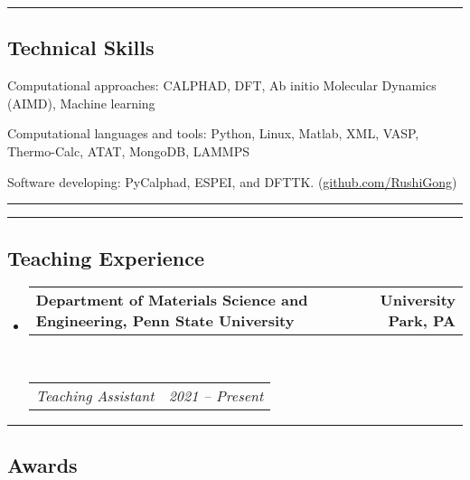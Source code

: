 \documentclass[10pt,letterpaper]{article}
\makeatletter
\newenvironment{indentsection}[1]%
{\begin{list}{}%
  {\setlength{\leftmargin}{#1}}%
  \item[]%
}
{\end{list}}
\newcommand{\headerrow}[2]
{\begin{tabular*}{\linewidth}{l@{\extracolsep{\fill}}r}
  #1 &
  #2 \\
\end{tabular*}}
\makeatother
\begin{document}
\hrule
\vspace{-0.6em}
\subsection*{Technical Skills}

\begin{indentsection}{\parindent}
\begin{description*}
  \item[Computational approaches:]
  CALPHAD, DFT, Ab initio Molecular Dynamics (AIMD), Machine learning
  \item[Computational languages and tools:]
  Python, Linux, Matlab, XML, VASP, Thermo-Calc, ATAT, MongoDB, LAMMPS
  \item [Software developing:]
  PyCalphad, ESPEI, and DFTTK. (\href{https://github.com/RushiGong}{github.com/RushiGong})
\end{description*}
\end{indentsection}

\hrule
\pagebreak

\hrule
\vspace{-0.6em}
\subsection*{Teaching Experience}

\renewcommand\labelitemiii{$\circ$}
\begin{itemize}
    \parskip=0.1em

    \item
    \headerrow
    {\textbf{Department of Materials Science and Engineering, Penn State University}}
    {\textbf{University Park, PA}}
    \\
    \headerrow
    {\emph{Teaching Assistant}}
    {\emph{2021 -- Present}}
\end{itemize}

\hrule
\vspace{-0.6em}
\subsection*{Awards}
\end{document}
